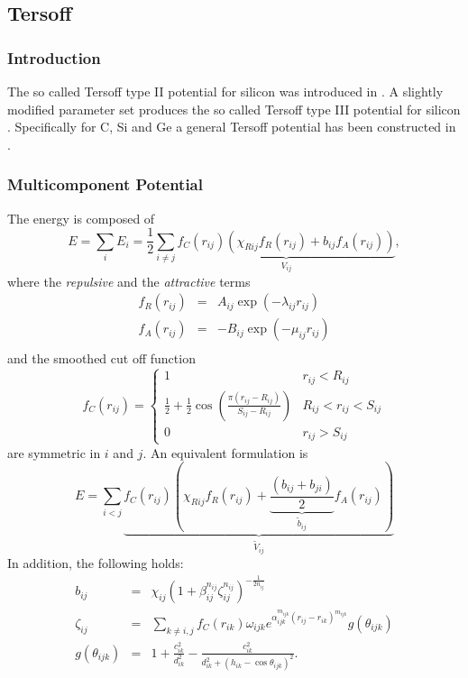 \subsection{Tersoff}
\subsubsection*{Introduction}
The so called Tersoff type II potential for silicon was introduced in \cite{tersoff88a}. A slightly modified parameter set produces the so called Tersoff type III potential for
silicon  \cite{tersoff88b}. Specifically for C, Si and Ge a general Tersoff potential has been constructed in \cite{tersoff89}.

\subsubsection{Multicomponent Potential}
The energy is composed of
\begin{equation*}
  E=\sum_iE_i=\frac{1}{2}\sum_{i\neq j}\underbrace{f_C(r_{ij})\left(\chi_{Rij}f_R(r_{ij})+b_{ij}f_A(r_{ij})\right)}_{V_{ij}}
  ,
\end{equation*}
where the \textit{repulsive} and the \textit{attractive} terms
\begin{eqnarray*}
  f_R(r_{ij}) & = &A_{ij}\exp(-\lambda_{ij}r_{ij}) \\
  f_A(r_{ij}) & = &-B_{ij}\exp(-\mu_{ij}r_{ij}) \\
\end{eqnarray*}
and the smoothed cut off function
\begin{equation*}
  f_C(r_{ij}) = \left\{
    \begin{array}{ll}
      1  & r_{ij} < R_{ij}\\
      \frac{1}{2}+\frac{1}{2}\cos\left(\frac{\pi(r_{ij}-R_{ij})}{S_{ij}-R_{ij}}\right)  & R_{ij} < r_{ij} < S_{ij}\\
      0  & r_{ij} > S_{ij}
    \end{array}
  \right.
\end{equation*}
are symmetric in $i$ and $j$. An equivalent formulation is
\begin{equation*}
  E=\sum_{i<j}\underbrace{f_C(r_{ij})\left(\chi_{Rij}f_R(r_{ij})+\underbrace{\frac{(b_{ij}+b_{ji})}{2}}_{\tilde{b}_{ij}}f_A(r_{ij})\right)}_{\tilde{V}_{ij}}
\end{equation*}
In addition, the following holds:
\begin{eqnarray*}
  b_{ij} & = & \chi_{ij}(1+\beta_{ij}^{n_{ij}}\zeta_{ij}^{n_{ij}})^{-\frac{1}{2n_{ij}}}\\
  \zeta_{ij} & = & \sum_{k\neq i, j}f_C(r_{ik})\omega_{ijk}e^{\alpha_{ijk}^{m_{ijk}}(r_{ij}-r_{ik})^{m_{ijk}}}g(\theta_{ijk})\\
  g(\theta_{ijk}) & = & 1+\frac{c_{ik}^2}{d_{ik}^2}-\frac{c_{ik}^2}{d_{ik}^2+(h_{ik}-\cos\theta_{ijk})^2}
  .
\end{eqnarray*}
